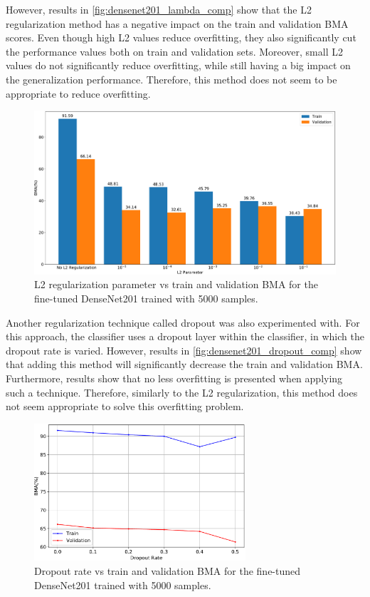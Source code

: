     However, results in \autoref{fig:densenet201_lambda_comp} show that the L2 regularization method has a negative impact on the train and validation \ac{BMA} scores. Even though high L2 values reduce overfitting, they also significantly cut the performance values both on train and validation sets. Moreover, small L2 values do not significantly reduce overfitting, while still having a big impact on the generalization performance. Therefore, this method does not seem to be appropriate to reduce overfitting. \par
    \begin{figure}[ht]
        \centering
        \includegraphics[width=\textwidth]{figs/densenet201_lambda_comp.pdf}
        \caption{L2 regularization parameter vs train and validation \ac{BMA} for the fine-tuned DenseNet201 trained with 5000 samples.}
        \label{fig:densenet201_lambda_comp}
    \end{figure}
    
    Another regularization technique called dropout \cite{Hinton2012} was also experimented with. For this approach, the classifier uses a dropout layer within the classifier, in which the dropout rate is varied. However, results in \autoref{fig:densenet201_dropout_comp} show that adding this method will significantly decrease the train and validation \ac{BMA}. Furthermore, results show that no less overfitting is presented when applying such a technique. Therefore, similarly to the L2 regularization, this method does not seem appropriate to solve this overfitting problem. \par 
    \begin{figure}[ht]
        \centering
        \includegraphics[width=0.7\textwidth]{figs/densenet201_dropout_comp.pdf}
        \caption{Dropout rate vs train and validation \ac{BMA} for the fine-tuned DenseNet201 trained with 5000 samples.}
        \label{fig:densenet201_dropout_comp}
    \end{figure}
    

